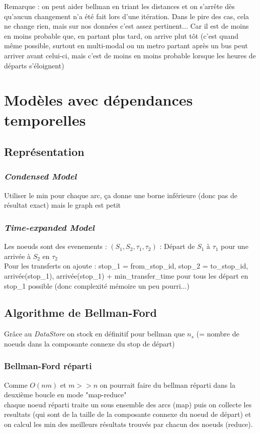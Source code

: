 \documentclass[a4paper,11pt]{article}
\begin{document}
Remarque : on peut aider bellman en triant les distances et on s'arrête dès qu'aucun changement n'a été fait lors d'une itération.
Dans le pire des cas, cela ne change rien, mais sur nos données c'est assez pertinent...
Car il est de moins en moins probable que, en partant plus tard, on arrive plut tôt (c'est quand même possible, surtout en multi-modal ou un metro partant après un bus peut arriver avant celui-ci, mais c'est de moins en moins probable lorsque les heures de départs s'éloignent)

\section{Modèles avec dépendances temporelles}
\subsection{Représentation}
\subsubsection{\textit{Condensed Model}}
Utiliser le min pour chaque arc, ça donne une borne inférieure (donc pas de résultat exact) mais le graph est petit
\subsubsection{\textit{Time-expanded Model}}
Les noeuds sont des evenements : $(S_1,S_2,\tau_1,\tau_2)$ : Départ de $S_1$ à $\tau_1$ pour une arrivée à $S_2$ en $\tau_2$\\
Pour les transferts on ajoute : stop\_1 = from\_stop\_id, stop\_2 = to\_stop\_id, arrivée(stop\_1), arrivée(stop\_1) + min\_transfer\_time
pour tous les départ en stop\_1 possible (donc complexité mémoire un peu pourri...)

\subsection{Algorithme de Bellman-Ford}

Grâce au \textit{DataStore} on stock en définitif pour bellman que $n_s$ (= nombre de noeuds dans la composante connexe du stop de départ)

\subsubsection{Bellman-Ford réparti}
Comme $O(nm)$ et $m >> n$ on pourrait faire du bellman réparti dans la deuxième boucle en mode "map-reduce"\\
chaque noeud réparti traite un sous ensemble des arcs (map) puis on collecte les resultats (qui sont de la taille de la composante connexe du noeud de départ)
et on calcul les min des meilleurs résultats trouvés par chacun des noeuds (reduce).
\end{document}
